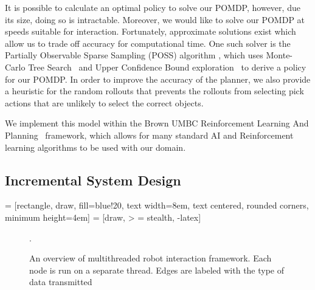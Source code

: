 \documentclass[conference]{IEEEtran}
\begin{document}
It is possible to calculate an optimal policy to solve our POMDP, however, due its size, doing so is intractable. Moreover, we would like to solve our POMDP at speeds suitable for interaction. Fortunately, approximate solutions exist which allow us to trade off accuracy for computational time. One such solver is the Partially Observable Sparse Sampling (POSS) algorithm \citep{Gopalan2016}, which uses Monte-Carlo Tree Search~\citep{coulom2006efficient} and Upper Confidence Bound exploration~\citep{kocsis2006bandit} to derive a policy for our POMDP. In order to improve the accuracy of the planner, we also provide a heuristic for the random rollouts that prevents the rollouts from selecting pick actions that are unlikely to select the correct objects. 

We implement this model within the Brown UMBC Reinforcement Learning And Planning~\citep{burlap} framework, which allows for many standard AI and Reinforcement learning algorithms to be used with our domain. 


\subsection{Incremental System Design}

 = [rectangle, draw, fill=blue!20, text width=8em, text centered, rounded corners, minimum height=4em]
 = [draw, > = stealth, -latex]

\begin{figure}
\begin{center}
\caption{An overview of multithreaded robot interaction framework. Each node is run on a separate thread. Edges are labeled with the type of data transmitted}
\label{fig:system}. 
\end{center}
\end{figure}
\end{document}
